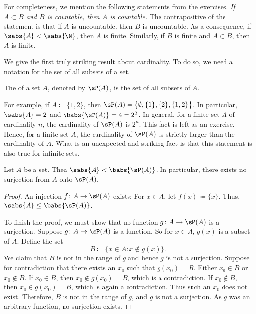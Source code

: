 For completeness, we mention the following statements
from the exercises.
\emph{If $A \subset
B$ and $B$ is countable, then $A$ is countable.}  The contrapositive of the
statement is that if $A$ is
uncountable, then $B$ is uncountable.
As a consequence, if $\sabs{A} < \sabs{\N}$, then $A$ is
finite.
Similarly, if $B$ is finite and $A \subset B$, then $A$ is finite.

\pagebreak[2]
We give the first truly striking result about cardinality.
To do so, we need a notation for
the set of all subsets of a set.

\begin{defn}
The \emph{} of a set $A$, denoted by $\sP(A)$,
 is the set of all subsets of $A$.
\end{defn}

For example, if $A \coloneqq \{ 1,2\}$,
then $\sP(A) = \bigl\{ \emptyset, \{ 1 \}, \{ 2 \}, \{ 1, 2 \} \bigr\}$.
In particular, $\sabs{A} = 2$ and $\babs{\sP(A)} = 4 = 2^2$.
In general,
for a finite set $A$ of cardinality $n$, the
cardinality of $\sP(A)$ is $2^n$.
This fact is left as an exercise.  
Hence, for a finite set $A$,
the cardinality of $\sP(A)$ is strictly
larger than the
cardinality of $A$.  What is an unexpected and
striking fact is that this statement is also true for infinite sets.

\begin{thm}
\label{cantorspowersetthm}
Let $A$ be a set.  Then
$\sabs{A} < \babs{\sP(A)}$.
In particular, there exists no surjection from
$A$ onto $\sP(A)$.
\end{thm}

\begin{proof}
An injection $f \colon A \to \sP(A)$ exists:
For $x \in A$, let $f(x) \coloneqq \{ x \}$.  Thus,
$\sabs{A} \leq \babs{\sP(A)}$.

To finish the proof, we must show that
no function $g \colon A \to \sP(A)$ is a surjection.
Suppose 
$g \colon A \to \sP(A)$ is a function.  So for $x \in A$,
$g(x)$ is a subset of $A$.  Define the set
\begin{equation*}
B \coloneqq \bigl\{ x \in A : x \notin g(x) \bigr\} .
\end{equation*}
We claim that $B$ is not in the range of $g$ and hence $g$ is not a
surjection.  Suppose for contradiction that there exists an $x_0$ such that $g(x_0) = B$.
Either $x_0 \in B$ or $x_0 \notin B$.  If $x_0 \in B$, then $x_0 \notin
g(x_0) = B$, which is a contradiction.  If $x_0 \notin B$, then $x_0 \in
g(x_0) = B$, which is again a contradiction.  Thus such an $x_0$ does not
exist.  Therefore, $B$ is not in the range of $g$, and $g$ is not a
surjection.  As $g$ was an arbitrary function, no surjection exists.
\end{proof}

